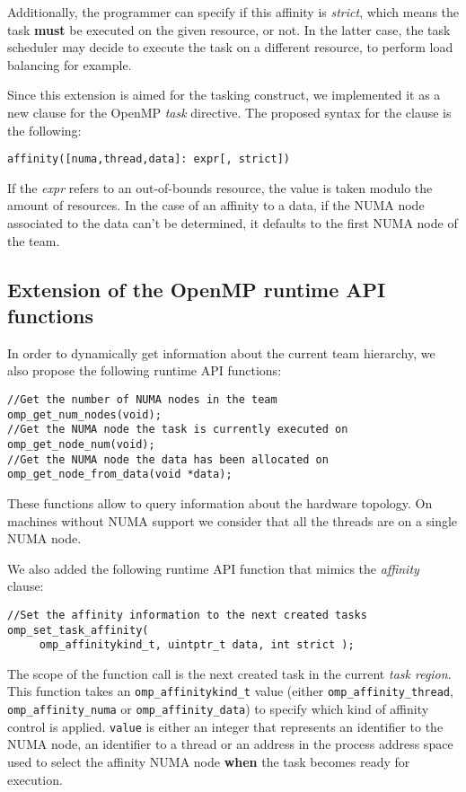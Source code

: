 \documentclass{Styles/llncs}
\begin{document}
Additionally, the programmer can specify if this affinity is \emph{strict}, which means the task \textbf{must} be executed on the given resource, or not. In the latter case, the task scheduler may decide to execute the task on a different resource, to perform load balancing for example.

Since this extension is aimed for the tasking construct, we implemented it as a new
clause for the OpenMP \emph{task} directive. The proposed syntax for the clause is the following:
\begin{lstlisting}
affinity([numa,thread,data]: expr[, strict])
\end{lstlisting}

If the \emph{expr} refers to an out-of-bounds resource, the value is taken modulo the amount of resources.
In the case of an affinity to a data, if the NUMA node associated to the data can't be determined, it defaults to the first NUMA node of the team.

\subsection{Extension of the OpenMP runtime API functions}
In order to dynamically get information about the current team hierarchy, we also propose
the following runtime API functions:
\begin{lstlisting}
//Get the number of NUMA nodes in the team
omp_get_num_nodes(void);
//Get the NUMA node the task is currently executed on
omp_get_node_num(void);
//Get the NUMA node the data has been allocated on
omp_get_node_from_data(void *data);
\end{lstlisting}

These functions allow to query information about the hardware topology. On machines without NUMA support we consider that all the threads are on a single NUMA node.

We also added the following runtime API function that mimics the \textit{affinity} clause:
\begin{lstlisting}
//Set the affinity information to the next created tasks
omp_set_task_affinity( 
     omp_affinitykind_t, uintptr_t data, int strict );
\end{lstlisting}
The scope of the function call is the next created task in the current \textit{task region}.
This function takes an \texttt{omp\_affinitykind\_t} value (either \texttt{omp\_affinity\_thread}, \texttt{omp\_affinity\_numa} or \texttt{omp\_affinity\_data}) to specify which kind of affinity control is applied. \texttt{value} is either an integer that represents an identifier to the NUMA node, an identifier to a thread or an address in the process address space used to select the affinity NUMA node \textbf{when} the task becomes ready for execution.
\end{document}
